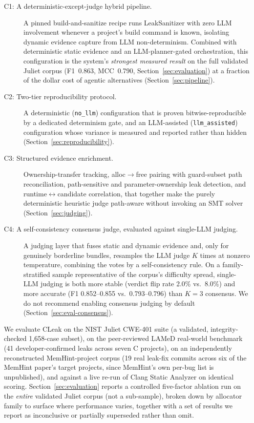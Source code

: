 \documentclass[11pt,a4paper]{article}
\begin{document}
\begin{description}
\item[C1: A deterministic-except-judge hybrid pipeline.] A pinned
  build-and-sanitize recipe runs LeakSanitizer with zero LLM involvement
  whenever a project's build command is known, isolating dynamic evidence
  capture from LLM non-determinism. Combined with deterministic static
  evidence and an LLM-planner-gated orchestration, this configuration is
  the system's \emph{strongest measured result} on the full validated
  Juliet corpus (F1~0.863, MCC~0.790, Section~\ref{sec:evaluation}) at a
  fraction of the dollar cost of agentic alternatives
  (Section~\ref{sec:pipeline}).
\item[C2: Two-tier reproducibility protocol.] A deterministic
  (\texttt{no\_llm}) configuration that is proven bitwise-reproducible by a
  dedicated determinism gate, and an LLM-assisted
  (\texttt{llm\_assisted}) configuration whose variance is measured and
  reported rather than hidden (Section~\ref{sec:reproducibility}).
\item[C3: Structured evidence enrichment.] Ownership-transfer tracking,
  alloc$\to$free pairing with guard-subset path reconciliation,
  path-sensitive and parameter-ownership leak detection, and
  runtime$\leftrightarrow$candidate correlation, that together make the
  purely deterministic heuristic judge path-aware without invoking an SMT
  solver (Section~\ref{sec:judging}).
\item[C4: A self-consistency consensus judge, evaluated against single-LLM
  judging.] A judging layer that fuses static and dynamic evidence and,
  only for genuinely borderline bundles, resamples the LLM judge $K$ times
  at nonzero temperature, combining the votes by a self-consistency rule.
  On a family-stratified sample representative of the corpus's difficulty
  spread, single-LLM judging is both more stable (verdict flip rate 2.0\%
  vs.\ 8.0\%) and more accurate (F1 0.852--0.855 vs.\ 0.793--0.796) than
  $K{=}3$ consensus. We do not recommend enabling consensus judging by
  default (Section~\ref{sec:eval-consensus}).
\end{description}

We evaluate CLeak on the NIST Juliet CWE-401 suite (a validated,
integrity-checked 1{,}658-case subset), on the peer-reviewed LAMeD
real-world benchmark (41 developer-confirmed leaks across seven C
projects), on an independently reconstructed MemHint-project corpus (19
real leak-fix commits across six of the MemHint paper's target projects,
since MemHint's own per-bug list is unpublished), and against a live
re-run of Clang Static Analyzer on identical scoring.
Section~\ref{sec:evaluation} reports a controlled five-factor ablation run
on the \emph{entire} validated Juliet corpus (not a sub-sample), broken
down by allocator family to surface where performance varies, together
with a set of results we report as inconclusive or partially superseded
rather than omit.
\end{document}

